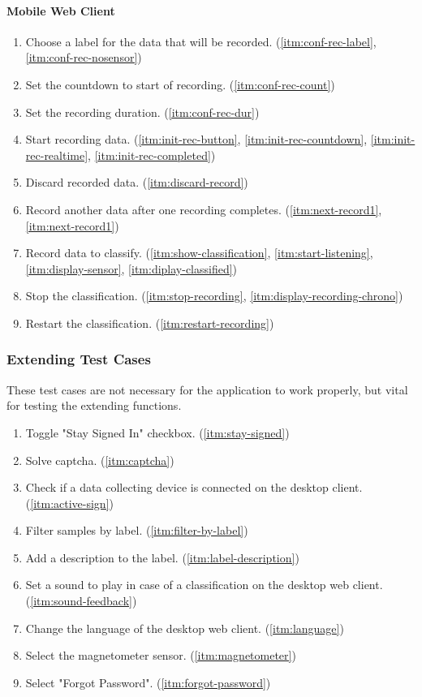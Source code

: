 \paragraph{Mobile Web Client}
\begin{enumerate}[resume*]
    \item Choose a label for the data that will be recorded. (\ref{itm:conf-rec-label}, \ref{itm:conf-rec-nosensor})
    \item Set the countdown to start of recording. (\ref{itm:conf-rec-count})
    \item Set the recording duration. (\ref{itm:conf-rec-dur})
    \item Start recording data. (\ref{itm:init-rec-button}, \ref{itm:init-rec-countdown}, \ref{itm:init-rec-realtime}, \ref{itm:init-rec-completed})
    \item Discard recorded data. (\ref{itm:discard-record})
    \item Record another data after one recording completes. (\ref{itm:next-record1}, \ref{itm:next-record1})
    \item Record data to classify. (\ref{itm:show-classification}, \ref{itm:start-listening}, \ref{itm:display-sensor}, \ref{itm:diplay-classified})
    \item Stop the classification. (\ref{itm:stop-recording}, \ref{itm:display-recording-chrono})
    \item Restart the classification. (\ref{itm:restart-recording})
\end{enumerate}

\subsubsection{Extending Test Cases}
These test cases are not necessary for the application to work properly, but vital for testing the extending functions. 
\begin{enumerate}[resume*]
    \item Toggle "Stay Signed In" checkbox. (\ref{itm:stay-signed})
    \item Solve captcha. (\ref{itm:captcha})
    \item Check if a data collecting device is connected on the desktop client. (\ref{itm:active-sign})
    \item Filter samples by label. (\ref{itm:filter-by-label})
    \item Add a description to the label. (\ref{itm:label-description})
    \item Set a sound to play in case of a classification on the desktop web client. (\ref{itm:sound-feedback})
    \item Change the language of the desktop web client. (\ref{itm:language})
    \item Select the magnetometer sensor. (\ref{itm:magnetometer})
    \item Select "Forgot Password". (\ref{itm:forgot-password})
\end{enumerate}

